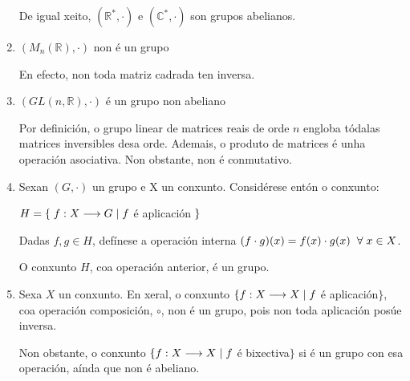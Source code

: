\documentclass[twoside]{report}
\theoremstyle{mystyle}
\begin{document}
\begin{enumerate}
    De igual xeito, $(\mathbb{R}^{*}, \cdot)$ e $(\mathbb{C}^{*}, \cdot)$ son grupos abelianos.
    
    \item $(M_{n}(\mathbb{R}), \cdot)$ non é un grupo
    
    \vspace{1mm}
    
    En efecto, non toda matriz cadrada ten inversa.
    
    \item $(GL(n, \mathbb{R}), \cdot)$ é un grupo non abeliano
    
    \vspace{1mm}
    
    Por definición, o grupo linear de matrices reais de orde $n$ engloba tódalas matrices inversibles desa orde. Ademais, o produto de matrices é unha operación asociativa. Non obstante, non é conmutativo.
    
    \item Sexan $(G, \cdot)$ un grupo e X un conxunto. Considérese entón o conxunto:
    
    \begin{center}
        $H = \{ \hspace{1mm} f: X \longrightarrow G \hspace{1mm} | \hspace{1mm} f$ é aplicación$ \hspace{1mm}\}$
    \end{center}
    
    Dadas $f,g \in H$, defínese a operación interna $(f \cdot g)(x) = f(x) \cdot g(x) \hspace{2mm} \forall \hspace{1mm} x \in X$.
    
    O conxunto $H$, coa operación anterior, é un grupo.
    
    \vspace{1mm}
    
    \item Sexa $X$ un conxunto. En xeral, o conxunto $\{ f: X \longrightarrow X \hspace{1MM} | \hspace{1MM} f$ é aplicación$\}$, coa operación composición, $\circ$, non é un grupo, pois non toda aplicación posúe inversa. 
    
    Non obstante, o conxunto $\{ f: X \longrightarrow X \hspace{1mm} | \hspace{1mm} f$ é bixectiva$\}$ si é un grupo con esa operación, aínda que non é abeliano.
    
\end{enumerate}
\end{document}

